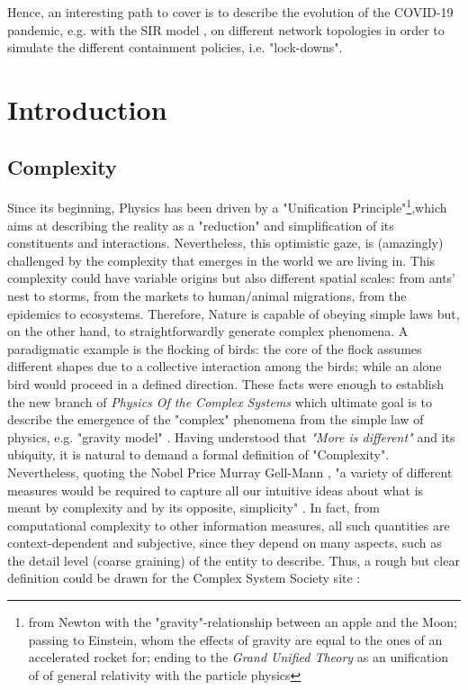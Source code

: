 \documentclass[a4paper,10pt]{book} %
\theoremstyle{definition}
\begin{document}
Hence, an interesting path to cover is to describe the evolution of the COVID-19 pandemic, e.g. with the SIR model \cite{pizzuti::2020_ItalyCOVIDnetwork}, on different network topologies in order to simulate the different containment policies, i.e. "lock-downs".

\mainmatter

\newcommand{\changefont}{%
    \fontsize{12}{12}
}
\pagestyle{fancy}
\fancyhf{}
\fancyhead[LE,RO]{\changefont \slshape \nouppercase{\rightmark}} %
\fancyhead[RE,LO]{\changefont \slshape \nouppercase{\leftmark}} %
\fancyfoot[C]{\thepage}

\chapter[Introduction]{Introduction}
%

\section{Complexity}
Since its beginning, Physics has been driven by a "Unification Principle"\footnote{from Newton with the "gravity"-relationship between an apple and the Moon; passing to Einstein, whom the effects of gravity are equal to the ones of an accelerated rocket for; ending to the \textit{Grand Unified Theory} as an unification of of general relativity with the particle physics},which aims at describing the reality as a "reduction" and simplification of its constituents and interactions. Nevertheless, this optimistic gaze, is (amazingly) challenged by the complexity that emerges in the world we are living in. This complexity could have variable origins but also different spatial scales: from ants' nest to storms, from the markets to human/animal migrations, from the epidemics to ecosystems. Therefore, Nature is capable of obeying simple laws but, on the other hand, to straightforwardly generate complex phenomena. A paradigmatic example is the flocking of birds: the core of the flock assumes different shapes due to a collective interaction among the birds; while an alone bird would proceed in a defined direction.
These facts were enough to establish the new branch of \textit{Physics Of the Complex Systems} which ultimate goal is to describe the emergence of the "complex" phenomena from the simple law of physics, e.g. "gravity model" \cite{GravityModelsandEmpiricalTrade}.
Having understood that \textit{"More is different"} \cite{Anderson:1972_MoreIsDifferent} and its ubiquity, it is natural to demand a formal definition of "Complexity". Nevertheless, quoting the Nobel Price Murray Gell-Mann \cite{Gell-Man:1987_S&C}, "a variety of different measures would be required to capture all our intuitive ideas about what is meant by complexity and by its opposite, simplicity" . In fact, from computational complexity to other information measures, all such quantities are context-dependent and subjective, since they depend on many aspects, such as the detail level (coarse graining) of the entity to describe. Thus, a rough but clear definition could be drawn for the Complex System Society site \cite{CSS:2021_compsystdef}:
\end{document}

